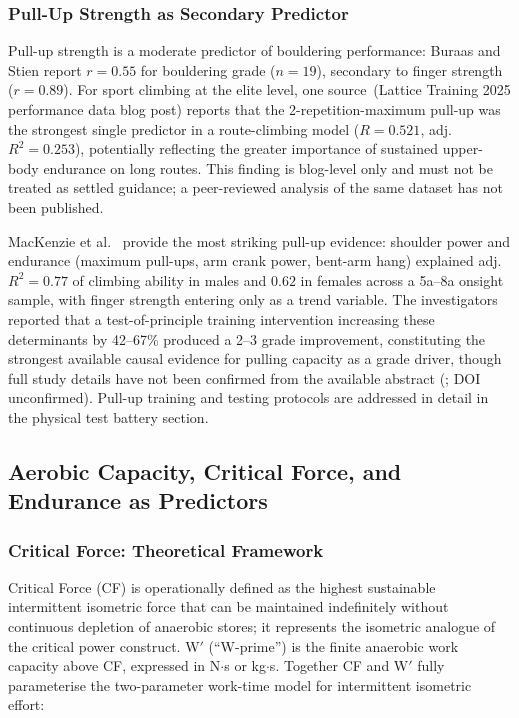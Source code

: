 \subsubsection{Pull-Up Strength as Secondary Predictor}

Pull-up strength is a moderate predictor of bouldering performance: Buraas and Stien \cite{BBW25} report $r = 0.55$ for bouldering grade ($n = 19$), secondary to finger strength ($r = 0.89$). For sport climbing at the elite level, one \toverify source\singlesource\ (Lattice Training 2025 performance data blog post) reports that the 2-repetition-maximum pull-up was the strongest single predictor in a route-climbing model ($R = 0.521$, adj.\ $R^{2} = 0.253$), potentially reflecting the greater importance of sustained upper-body endurance on long routes. This finding is blog-level only and must not be treated as settled guidance; a peer-reviewed analysis of the same dataset has not been published.

MacKenzie et al.\ \cite{TEMP_MacKenzie2020} provide the most striking pull-up evidence: shoulder power and endurance (maximum pull-ups, arm crank power, bent-arm hang) explained adj.\ $R^{2} = 0.77$ of climbing ability in males and $0.62$ in females across a 5a--8a onsight sample, with finger strength entering only as a trend variable. The investigators reported that a test-of-principle training intervention increasing these determinants by 42--67\% produced a 2--3 grade improvement, constituting the strongest available causal evidence for pulling capacity as a grade driver, though full study details have not been confirmed from the available abstract (\toverify; DOI unconfirmed). Pull-up training and testing protocols are addressed in detail in the physical test battery section.

\subsection{Aerobic Capacity, Critical Force, and Endurance as Predictors}
\label{sec:cfpredictor}

\subsubsection{Critical Force: Theoretical Framework}

Critical Force (CF) is operationally defined as the highest sustainable intermittent isometric force that can be maintained indefinitely without continuous depletion of anaerobic stores; it represents the isometric analogue of the critical power construct.
W$'$ (``W-prime'') is the finite anaerobic work capacity above CF, expressed in N$\cdot$s or kg$\cdot$s.
Together CF and W$'$ fully parameterise the two-parameter work-time model for intermittent isometric effort:

